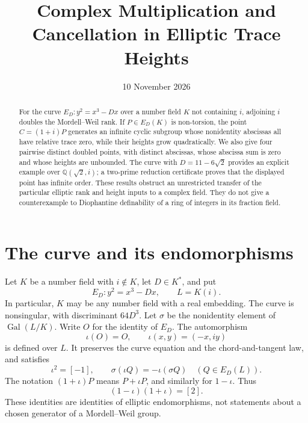 \documentclass[11pt,a4paper]{article}
\title{Complex Multiplication and Cancellation in Elliptic Trace Heights}
\author{}\date{10 November 2026}
\newcommand{\Q}{\mathbb Q}\newcommand{\Z}{\mathbb Z}
\begin{document}
\maketitle
\begin{abstract}
For the curve $E_D:y^2=x^3-Dx$ over a number field $K$ not
containing $i$, adjoining $i$ doubles the Mordell--Weil rank.
If $P\in E_D(K)$ is non-torsion, the point $C=(1+i)P$ generates
an infinite cyclic subgroup whose nonidentity abscissas all have
relative trace zero, while their heights grow quadratically.
We also give four pairwise distinct doubled points, with distinct
abscissas, whose abscissa sum is zero and whose heights are
unbounded. The curve with $D=11-6\sqrt2$ provides an explicit
example over $\Q(\sqrt2,i)$; a two-prime reduction certificate
proves that the displayed point has infinite order. These results
obstruct an unrestricted transfer of the particular elliptic rank
and height inputs to a complex field. They do not give a
counterexample to Diophantine definability of a ring of integers
in its fraction field.
\end{abstract}

\section{The curve and its endomorphisms}

Let $K$ be a number field with $i\notin K$, let $D\in K^*$, and put
\[
 E_D:y^2=x^3-Dx,\qquad L=K(i).
\]
In particular, $K$ may be any number field with a real embedding.
The curve is nonsingular, with discriminant $64D^3$.
Let $\sigma$ be the nonidentity element of $\operatorname{Gal}(L/K)$.
Write $O$ for the identity of $E_D$. The automorphism
\begin{equation}\label{eq:iota}
             \iota(O)=O,\qquad \iota(x,y)=(-x,iy)
\end{equation}
is defined over $L$. It preserves the curve equation and the
chord-and-tangent law, and satisfies
\begin{equation}\label{eq:endomorphisms}
 \iota^2=[-1],\qquad \sigma(\iota Q)=-\iota(\sigma Q)
                         \quad(Q\in E_D(L)).
\end{equation}
The notation $(1+\iota)P$ means $P+\iota P$, and similarly for
$1-\iota$. Thus
\begin{equation}\label{eq:normendo}
                    (1-\iota)(1+\iota)=[2].
\end{equation}
These identities are identities of elliptic endomorphisms, not
statements about a chosen generator of a Mordell--Weil group.
\end{document}
